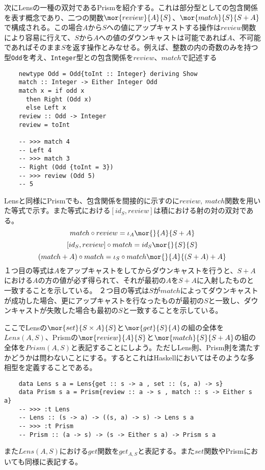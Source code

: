 \documentclass[uplatex,dvipdfmx]{jsarticle}
\newcommand{\pr}[1]{\colorbox[rgb]{0.9,0.9,0.9}{\lstinline{#1}}}
\begin{document}
  次にLensの一種の双対であるPrismを紹介する。これは部分型としての包含関係を表す概念であり、二つの関数$\mor{review}{A}{S}$、$\mor{match}{S}{S+A}$で構成される。この場合$A$から$S$への値にアップキャストする操作は$review$関数により容易に行えて、$S$から$A$への値のダウンキャストは可能であれば$A$、不可能であればそのまま$S$を返す操作とみなせる。例えば、整数の内の奇数のみを持つ型\pr{Odd}を考え、\pr{Integer}型との包含関係を$review$、$match$で記述する
  \begin{lstlisting}   
    newtype Odd = Odd{toInt :: Integer} deriving Show
    match :: Integer -> Either Integer Odd
    match x = if odd x 
      then Right (Odd x)
      else Left x
    review :: Odd -> Integer
    review = toInt

    -- >>> match 4
    -- Left 4
    -- >>> match 3
    -- Right (Odd {toInt = 3})
    -- >>> review (Odd 5)
    -- 5
  \end{lstlisting}
  Lensと同様にPrismでも、包含関係を間接的に示すのに$review,\ match$関数を用いた等式で示す。また等式における$[id_S,review]$は積における射の対の双対である。
  \[match\circ review = \iota_A\mor{}{A}{S+A}\]
  \[[id_S,review]\circ match = id_S\mor{}{S}{S}\]
  \[(match+A)\circ match = \iota_S\circ match\mor{}{A}{(S+A)+A}\]
  １つ目の等式は$A$をアップキャストをしてからダウンキャストを行うと、$S+A$における$A$の方の値が必ず得られて、それが最初の$A$を$S+A$に入射したものと一致することを示している。
  ２つ目の等式は$S$が$match$によってダウンキャストが成功した場合、更にアップキャストを行なったものが最初の$S$と一致し、ダウンキャストが失敗した場合も最初の$S$と一致することを示している。
  
  ここでLensの$\mor{set}{S\times A}{S}$と$\mor{get}{S}{A}$の組の全体を$Lens(A,S)$、Prismの$\mor{review}{A}{S}$と$\mor{match}{S}{S+A}$の組の全体を$Prism(A,S)$と表記することにしよう。ただしLens則、Prism則を満たすかどうかは問わないことにする。するとこれはHaskellにおいてはそのような多相型を定義することである。
  \begin{lstlisting}
    data Lens s a = Lens{get :: s -> a , set :: (s, a) -> s}
    data Prism s a = Prism{review :: a -> s , match :: s -> Either s a}
    -- >>> :t Lens
    -- Lens :: (s -> a) -> ((s, a) -> s) -> Lens s a
    -- >>> :t Prism
    -- Prism :: (a -> s) -> (s -> Either s a) -> Prism s a
  \end{lstlisting}

  また$Lens(A,S)$における$get$関数を$get_{A,S}$と表記する。また$set$関数やPrismにおいても同様に表記する。
  
\end{document}
